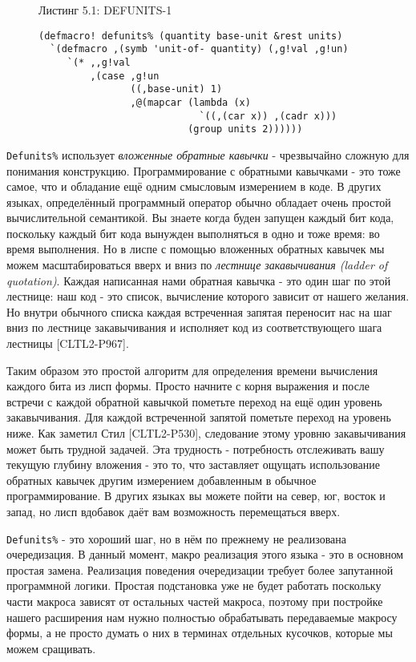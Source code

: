 \begin{figure}Листинг 5.1: DEFUNITS-1\label{listing_5.1}
\listbegin
\begin{verbatim}
(defmacro! defunits% (quantity base-unit &rest units)
  `(defmacro ,(symb 'unit-of- quantity) (,g!val ,g!un)
     `(* ,,g!val
         ,(case ,g!un
                ((,base-unit) 1)
                ,@(mapcar (lambda (x)
                            `((,(car x)) ,(cadr x)))
                          (group units 2))))))
\end{verbatim}
\listend
\end{figure}

\verb"Defunits%" использует \emph{вложенные обратные кавычки} - чрезвычайно сложную для понимания конструкцию. Программирование с обратными кавычками - это тоже самое, что и обладание ещё одним смысловым измерением в коде. В других языках, определённый программный оператор обычно обладает очень простой вычислительной семантикой. Вы знаете когда буден запущен каждый бит кода, поскольку каждый бит кода вынужден выполняться в одно и тоже время: во время выполнения. Но в лиспе с помощью вложенных обратных кавычек мы можем масштабироваться вверх и вниз по \emph{лестнице закавычивания (ladder of quotation)}. Каждая написанная нами обратная кавычка - это один шаг по этой лестнице: наш код - это список, вычисление которого зависит от нашего желания. Но внутри обычного списка каждая встреченная запятая переносит нас на шаг вниз по лестнице закавычивания и исполняет код из соответствующего шага лестницы [CLTL2-P967].

Таким образом это простой алгоритм для определения времени вычисления каждого бита из лисп формы. Просто начните с корня выражения и после встречи с каждой обратной кавычкой пометьте переход на ещё один уровень закавычивания. Для каждой встреченной запятой пометьте переход на уровень ниже. Как заметил Стил [CLTL2-P530], следование этому уровню закавычивания может быть трудной задачей. Эта трудность - потребность отслеживать вашу текущую глубину вложения - это то, что заставляет ощущать использование обратных кавычек другим измерением добавленным в обычное программирование. В других языках вы можете пойти на север, юг, восток и запад, но лисп вдобавок даёт вам возможность перемещаться вверх.

\verb"Defunits%" - это хороший шаг, но в нём по прежнему не реализована очередизация. В данный момент, макро реализация этого языка - это в основном простая замена. Реализация поведения очередизации требует более запутанной программной логики. Простая подстановка уже не будет работать поскольку части макроса зависят от остальных частей макроса, поэтому при постройке нашего расширения нам нужно полностью обрабатывать передаваемые макросу формы, а не просто думать о них в терминах отдельных кусочков, которые мы можем сращивать.

